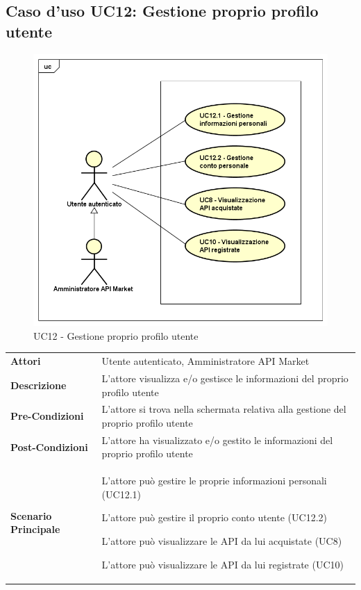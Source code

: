 \newpage
\subsection{Caso d'uso UC12: Gestione proprio profilo utente}
\label{UC12}
\begin{figure}[ht]
	\centering
	\includegraphics[scale=0.45]{UML/UC12.png}
	\caption{UC12 - Gestione proprio profilo utente}
\end{figure}

\begin{longtable}{ l | p{11cm}}
	\hline
	\rowcolor{Gray}
	\multicolumn{2}{c}{UC12 - Gestione proprio profilo utente} \\
	\hline
	\textbf{Attori} & Utente autenticato, Amministratore API Market \\
	\textbf{Descrizione} & L'attore visualizza e/o gestisce le informazioni del proprio profilo utente \\
	\textbf{Pre-Condizioni} & L'attore si trova nella schermata relativa alla gestione del proprio profilo utente \\
	\textbf{Post-Condizioni} & L'attore ha visualizzato e/o gestito le informazioni del proprio profilo utente \\
	\textbf{Scenario Principale} & 
	\begin{enumerate*}[label=(\arabic*.),itemjoin={\newline}]
		\item L'attore può gestire le proprie informazioni personali (UC12.1)
		\item L'attore può gestire il proprio conto utente (UC12.2)
		\item L'attore può visualizzare le API da lui acquistate (UC8)
		\item L'attore può visualizzare le API da lui registrate (UC10)
	\end{enumerate*}\\
\end{longtable}

